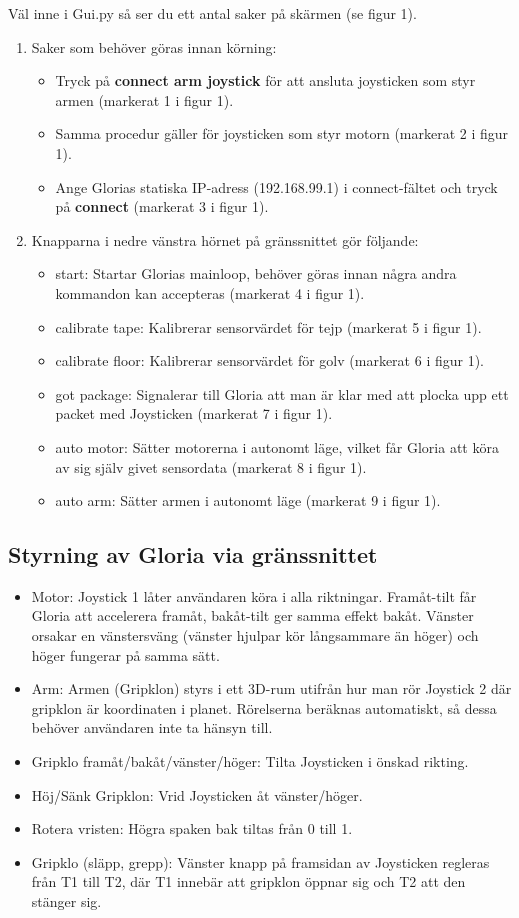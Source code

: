Väl inne i Gui.py så ser du ett antal saker på skärmen (se figur 1).
\begin{enumerate}
	\item Saker som behöver göras innan körning:
	\begin{itemize}
		\item Tryck på \textbf{connect arm joystick} för att ansluta joysticken som styr armen (markerat 1 i figur 1).
		\item Samma procedur gäller för joysticken som styr motorn (markerat 2 i figur 1).
		\item Ange Glorias statiska IP-adress (192.168.99.1) i connect-fältet och tryck på \textbf{connect} (markerat 3 i figur 1).
	\end{itemize}
	\item Knapparna i nedre vänstra hörnet på gränssnittet gör följande:
	\begin{itemize}
		\item start: Startar Glorias mainloop, behöver göras innan några andra kommandon kan accepteras (markerat 4 i figur 1).
		\item calibrate tape: Kalibrerar sensorvärdet för tejp (markerat 5 i figur 1).
		\item calibrate floor: Kalibrerar sensorvärdet för golv (markerat 6 i figur 1).
		\item got package: Signalerar till Gloria att man är klar med att plocka upp ett packet med Joysticken (markerat 7 i figur 1).
		\item auto motor: Sätter motorerna i autonomt läge, vilket får Gloria att köra av sig själv givet sensordata (markerat 8 i figur 1).
		\item auto arm: Sätter armen i autonomt läge (markerat 9 i figur 1).
	\end{itemize}
\end{enumerate}
\subsection{Styrning av Gloria via gränssnittet}
	\begin{itemize}	
		\item Motor: Joystick 1 låter användaren köra i alla riktningar. Framåt-tilt får Gloria att accelerera framåt, bakåt-tilt ger samma effekt bakåt. Vänster orsakar en vänstersväng (vänster hjulpar kör långsammare än höger) och höger fungerar på samma sätt.
		\item Arm: Armen (Gripklon) styrs i ett 3D-rum utifrån hur man rör Joystick 2 där gripklon är koordinaten i planet. Rörelserna beräknas automatiskt, så dessa behöver användaren inte ta hänsyn till. 
		\item Gripklo framåt/bakåt/vänster/höger: Tilta Joysticken i önskad rikting.
		\item Höj/Sänk Gripklon: Vrid Joysticken åt vänster/höger.
		\item Rotera vristen: Högra spaken bak tiltas från 0 till 1.
		\item Gripklo (släpp, grepp): Vänster knapp på framsidan av Joysticken regleras från T1 till T2, där T1 innebär att gripklon öppnar sig och T2 att den stänger sig.
	\end{itemize}
